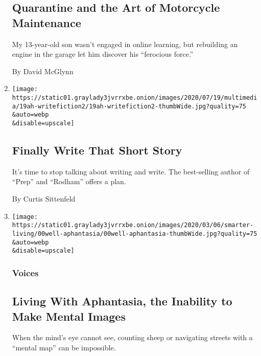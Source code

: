 \begin{enumerate}
  \hypertarget{quarantine-and-the-art-of-motorcycle-maintenance}{%
  \subsection{Quarantine and the Art of Motorcycle
  Maintenance}\label{quarantine-and-the-art-of-motorcycle-maintenance}}

  My 13-year-old son wasn't engaged in online learning, but rebuilding
  an engine in the garage let him discover his ``ferocious force.''

  By David McGlynn
\item
  \href{/2020/07/18/at-home/coronavirus-fiction-writing.html}{}

  \texttt{[image: https://static01.graylady3jvrrxbe.onion/images/2020/07/19/multimedia/19ah-writefiction2/19ah-writefiction2-thumbWide.jpg?quality=75\\\&auto=webp\\\&disable=upscale]}

  \hypertarget{finally-write-that-short-story}{%
  \subsection{Finally Write That Short
  Story}\label{finally-write-that-short-story}}

  It's time to stop talking about writing and write. The best-selling
  author of ``Prep'' and ``Rodham'' offers a plan.

  By Curtis Sittenfeld
\item
  \href{/2020/07/15/well/mind/aphantasia-mental-images.html}{}

  \texttt{[image: https://static01.graylady3jvrrxbe.onion/images/2020/03/06/smarter-living/00well-aphantasia/00well-aphantasia-thumbWide.jpg?quality=75\\\&auto=webp\\\&disable=upscale]}

  \hypertarget{voices}{%
  \subsubsection{Voices}\label{voices}}

  \hypertarget{living-with-aphantasia-the-inability-to-make-mental-images}{%
  \subsection{Living With Aphantasia, the Inability to Make Mental
  Images}\label{living-with-aphantasia-the-inability-to-make-mental-images}}

  When the mind's eye cannot see, counting sheep or navigating streets
  with a ``mental map'' can be impossible.


\end{enumerate}
